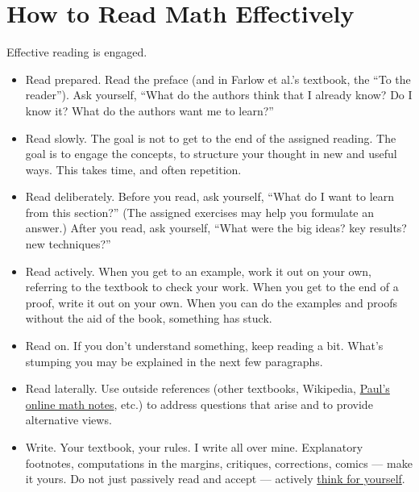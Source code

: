 \section{How to Read Math Effectively}

Effective reading is engaged.
\begin{itemize}
\item Read prepared. Read the preface (and in Farlow et al.'s textbook, the ``To the reader''). Ask yourself, ``What do the authors think that I already know? Do I know it? What do the authors want me to learn?''
\item Read slowly. The goal is not to get to the end of the assigned reading. The goal is to engage the concepts, to structure your thought in new and useful ways. This takes time, and often repetition.
\item Read deliberately. Before you read, ask yourself, ``What do I want to learn from this section?'' (The assigned exercises may help you formulate an answer.) After you read, ask yourself, ``What were the big ideas? key results? new techniques?''
\item Read actively. When you get to an example, work it out on your own, referring to the textbook to check your work. When you get to the end of a proof, write it out on your own. When you can do the examples and proofs without the aid of the book, something has stuck.
\item Read on. If you don't understand something, keep reading a bit. What's stumping you may be explained in the next few paragraphs.
\item Read laterally. Use outside references (other textbooks, Wikipedia, \href{http://tutorial.math.lamar.edu/}{Paul's online math notes}, etc.) to address questions that arise and to provide alternative views.
\item Write. Your textbook, your rules. I write all over mine. Explanatory footnotes, computations in the margins, critiques, corrections, comics --- make it yours. %
Do not just passively read and accept --- actively \href{https://www.youtube.com/watch?v=tpeLSMKNFO4}{think for yourself}.
\end{itemize}